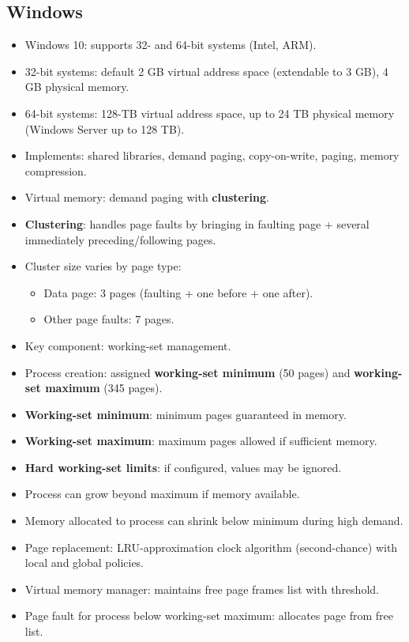 \subsection{Windows}
\begin{itemize}
    \item Windows 10: supports 32- and 64-bit systems (Intel, ARM).
    \item 32-bit systems: default 2 GB virtual address space (extendable to 3 GB), 4 GB physical memory.
    \item 64-bit systems: 128-TB virtual address space, up to 24 TB physical memory (Windows Server up to 128 TB).
    \item Implements: shared libraries, demand paging, copy-on-write, paging, memory compression.
    \item Virtual memory: demand paging with \textbf{clustering}.
    \item \textbf{Clustering}: handles page faults by bringing in faulting page + several immediately preceding/following pages.
    \item Cluster size varies by page type:
    \begin{itemize}
        \item Data page: 3 pages (faulting + one before + one after).
        \item Other page faults: 7 pages.
    \end{itemize}
    \item Key component: working-set management.
    \item Process creation: assigned \textbf{working-set minimum} (50 pages) and \textbf{working-set maximum} (345 pages).
    \item \textbf{Working-set minimum}: minimum pages guaranteed in memory.
    \item \textbf{Working-set maximum}: maximum pages allowed if sufficient memory.
    \item \textbf{Hard working-set limits}: if configured, values may be ignored.
    \item Process can grow beyond maximum if memory available.
    \item Memory allocated to process can shrink below minimum during high demand.
    \item Page replacement: LRU-approximation clock algorithm (second-chance) with local and global policies.
    \item Virtual memory manager: maintains free page frames list with threshold.
    \item Page fault for process below working-set maximum: allocates page from free list.

\end{itemize}
